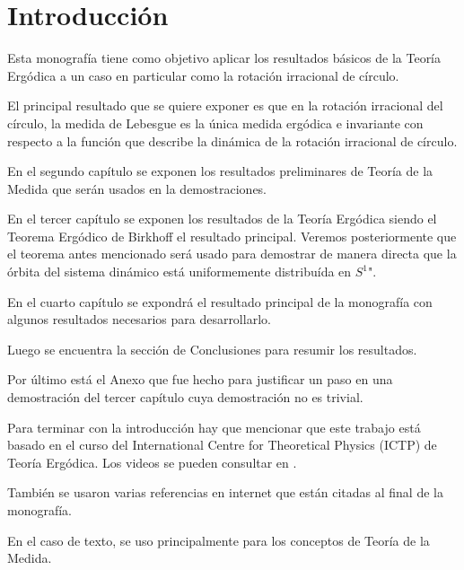 \chapter{Introducción}

Esta monografía tiene como objetivo aplicar los resultados básicos de la Teoría Ergódica a un caso en particular como la rotación irracional de círculo.

El principal resultado que se quiere exponer es que en la rotación irracional del círculo, la medida de Lebesgue es la única medida ergódica e invariante con respecto a la función que describe la dinámica de la rotación irracional de círculo.

En el segundo capítulo se exponen los resultados preliminares de Teoría de la Medida que serán usados en la demostraciones.

En el tercer capítulo se exponen los resultados de la Teoría Ergódica siendo el Teorema Ergódico de Birkhoff el resultado principal. Veremos posteriormente que el teorema antes mencionado será usado para demostrar de manera directa que la órbita del sistema dinámico está uniformemente distribuída en $S^1$".

En el cuarto capítulo se expondrá el resultado principal de la monografía con algunos resultados necesarios para desarrollarlo.

Luego se encuentra la sección de Conclusiones para resumir los resultados.

Por último está el Anexo que fue hecho para justificar un paso en una demostración del tercer capítulo cuya demostración no es trivial.

Para terminar con la introducción hay que mencionar que este trabajo está basado en el curso del International Centre for Theoretical Physics (ICTP) de Teoría Ergódica. Los videos se pueden consultar en \cite{youtube}.

También se usaron varias referencias en internet que están citadas al final de la monografía.

En el caso de texto, se uso principalmente \cite{bartle} para los conceptos de Teoría de la Medida.